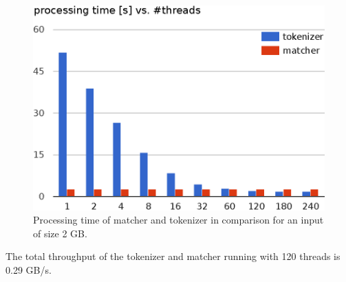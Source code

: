 \begin{figure}[h]\centering
  \includegraphics[scale=.66]{img/matcher_tokenizer_p_time.eps}
  \caption{Processing time of matcher and tokenizer in comparison for an input of size 2 GB.
  \label{matcher_tokenizer_pt}}
\end{figure}

The total throughput of the tokenizer and matcher running with 120 threads is 0.29 GB/s.
